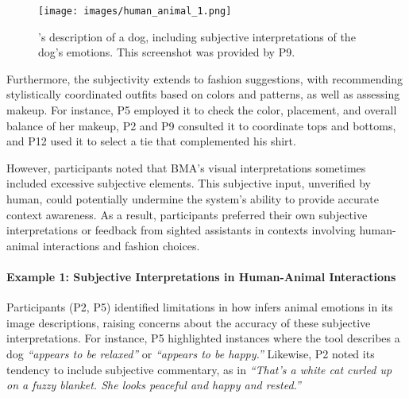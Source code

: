 \begin{figure}[t!]
\centering
\texttt{[image: images/human\_animal\_1.png]}
\caption{\bma's description of a dog, including subjective interpretations of the dog's emotions. This screenshot was provided by P9.}
\label{human_animal}
\end{figure}
Furthermore, the subjectivity extends to fashion suggestions, with \bma{} recommending stylistically coordinated outfits based on colors and patterns, as well as assessing makeup. 
For instance, P5 employed it to check the color, placement, and overall balance of her makeup, P2 and P9 consulted it to coordinate tops and bottoms, and P12 used it to select a tie that complemented his shirt. 


However, participants noted that BMA's visual interpretations sometimes included excessive subjective elements. 
This subjective input, unverified by human, could potentially undermine the system's ability to provide accurate context awareness.  
As a result, participants preferred their own subjective interpretations or feedback from sighted assistants in contexts involving human-animal interactions and fashion choices. 




\paragraph{Example 1: Subjective Interpretations in Human-Animal Interactions}


Participants (P2, P5) identified limitations in how \sbma{} infers animal emotions in its image descriptions, raising concerns about the accuracy of these subjective interpretations. 
For instance, P5 highlighted instances where the tool describes a dog \textit{``appears to be relaxed''} or \textit{``appears to be happy.''} 
Likewise, P2 noted its tendency to include subjective commentary, as in \textit{``That's a white cat curled up on a fuzzy blanket. She looks peaceful and happy and rested.''} 



